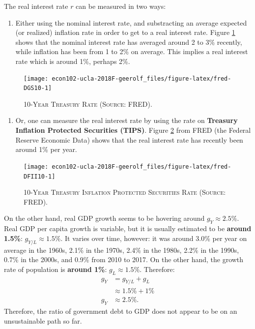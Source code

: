 \documentclass[]{book}
\providecommand{\tightlist}{%
  \setlength{\itemsep}{0pt}\setlength{\parskip}{0pt}}
\begin{document}
The real interest rate \(r\) can be measured in two ways:

\begin{enumerate}
\def\labelenumi{\arabic{enumi}.}
\tightlist
\item
  Either using the nominal interest rate, and substracting an average
  expected (or realized) inflation rate in order to get to a real
  interest rate. Figure \ref{fig:fred-DGS10} shows that the nominal
  interest rate has averaged around 2 to 3\% recently, while inflation
  has been from 1 to 2\% on average. This implies a real interest rate
  which is around 1\%, perhaps 2\%.
\end{enumerate}



\begin{figure}

{\centering \texttt{[image: econ102-ucla-2018F-geerolf\_files/figure-latex/fred-DGS10-1]} 

}

\caption{\textsc{10-Year Treasury Rate (Source: FRED).}}\label{fig:fred-DGS10}
\end{figure}

\begin{enumerate}
\def\labelenumi{\arabic{enumi}.}
\setcounter{enumi}{1}
\tightlist
\item
  Or, one can measure the real interest rate by using the rate on
  \textbf{Treasury Inflation Protected Securities (TIPS)}. Figure
  \ref{fig:fred-DFII10} from FRED (the Federal Reserve Economic Data)
  shows that the real interest rate has recently been around 1\% per
  year.
\end{enumerate}




\begin{figure}

{\centering \texttt{[image: econ102-ucla-2018F-geerolf\_files/figure-latex/fred-DFII10-1]} 

}

\caption{\textsc{10-Year Treasury Inflation Protected
Securities Rate (Source: FRED).}}\label{fig:fred-DFII10}
\end{figure}

On the other hand, real GDP growth seems to be hovering around
\(g_Y \approx 2.5\%\). Real GDP per capita growth is variable, but it is
usually estimated to be \textbf{around 1.5\%}:
\(g_{Y/L} \approx 1.5\%\). It varies over time, however: it was around
3.0\% per year on average in the 1960s, 2.1\% in the 1970s, 2.4\% in the
1980s, 2.2\% in the 1990s, 0.7\% in the 2000s, and 0.9\% from 2010 to
2017. On the other hand, the growth rate of population is \textbf{around
1\%}: \(g_{L} \approx 1.5\%\). Therefore: \[
\begin{aligned}
g_Y &= g_{Y/L} + g_L\\
&\approx 1.5\% + 1\% \\
g_Y &\approx 2.5\%.
\end{aligned}
\] Therefore, the ratio of government debt to GDP does not appear to be
on an unsustainable path so far.
\end{document}
